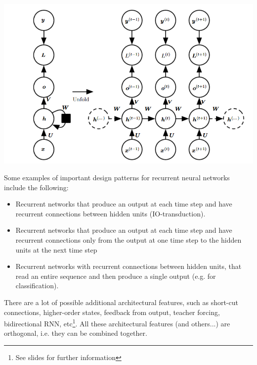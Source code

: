 \begin{center}
    \includegraphics[scale=0.8]{images/rnn-computational-graph.png}
\end{center}
Some examples of important design patterns for recurrent neural networks
include the following:
\begin{itemize}
    \item Recurrent networks that produce an output at each time step and have recurrent connections between hidden units (IO-transduction).

    \item Recurrent networks that produce an output at each time step and have recurrent connections only from the output at one time step to the hidden units at the next time step

    \item Recurrent networks with recurrent connections between hidden units, that read an entire sequence and then produce a single output (e.g. for classification).
\end{itemize}
There are a lot of possible additional architectural features, such as short-cut connections, higher-order states, feedback from output, teacher forcing, bidirectional RNN, etc\footnote{See slides for further information}. All these architectural features (and others...) are orthogonal, i.e. they can be combined together.


